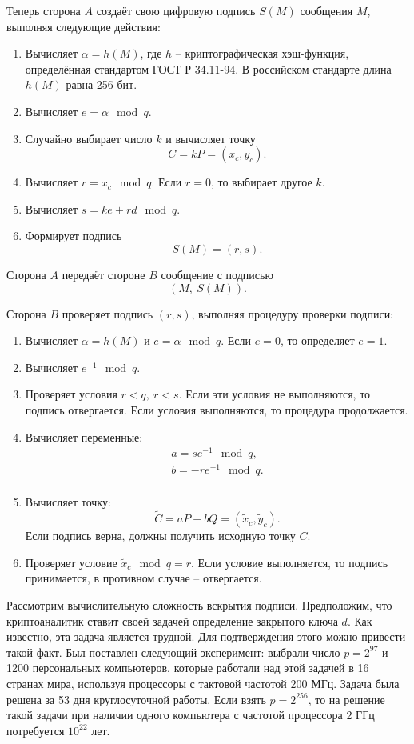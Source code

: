 Теперь сторона $A$ создаёт свою цифровую подпись $S(M)$ сообщения $M$, выполняя следующие действия:
\begin{enumerate}
    \item Вычисляет $\alpha = h(M)$, где $h$ -- криптографическая хэш-функция, определённая стандартом ГОСТ Р 34.11-94. В российском стандарте длина $h(M)$ равна 256 бит.
    \item Вычисляет $e = \alpha \mod q$.
    \item Случайно выбирает число $k$ и вычисляет точку
        \[ C = k P = (x_c, y_c). \]
    \item Вычисляет $r = x_c \mod q$.
	Если $r = 0$, то выбирает другое $k$.
    \item Вычисляет $s = k e + r d \mod q$.
    \item Формирует подпись
        \[ S(M) = (r, s). \]
\end{enumerate}
Сторона $A$ передаёт стороне $B$ сообщение с подписью
    \[ (M, ~ S(M)). \]

Сторона $B$ проверяет подпись $(r,s)$, выполняя процедуру проверки подписи:
\begin{enumerate}
    \item Вычисляет $\alpha = h(M)$ и $e = \alpha \mod q$. Если $e = 0$, то определяет $e = 1$.
    \item Вычисляет $e^{-1} \mod q$.
    \item Проверяет условия $r < q, ~ r < s$. Если эти условия не выполняются, то подпись отвергается. Если условия выполняются, то процедура продолжается.
    \item Вычисляет переменные:
        \[ \begin{array}{l}
            a = s e^{-1} \mod q, \\
            b = -r e^{-1} \mod q. \\
        \end{array} \]
    \item Вычисляет точку:
        \[ \tilde{C} = a P + b Q = (\tilde{x}_c, \tilde{y}_c). \]
        Если подпись верна, должны получить исходную точку $C$.
    \item Проверяет условие $\tilde{x}_{c} \mod q = r$. Если условие выполняется, то подпись принимается, в противном случае -- отвергается.
\end{enumerate}

Рассмотрим вычислительную сложность вскрытия подписи. Предположим, что криптоаналитик ставит своей задачей определение закрытого ключа $d$. Как известно, эта задача является трудной. Для подтверждения этого можно привести такой факт. Был поставлен следующий эксперимент: выбрали число $p = 2^{97}$ и 1200 персональных компьютеров, которые работали над этой задачей в 16 странах мира, используя процессоры с тактовой частотой 200 МГц. Задача была решена за 53 дня круглосуточной работы. Если взять $p = 2^{256}$, то на решение такой задачи при наличии одного компьютера с частотой процессора 2 ГГц потребуется $10^{22}$ лет.
